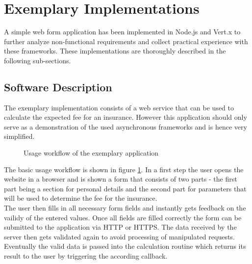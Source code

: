     


\newpage
\section{Exemplary Implementations}
\label{exemplary_implementations}

A simple web form application has been implemented in Node.js and Vert.x to
further analyze non-functional requirements and collect practical experience
with these frameworks. These implementations are thoroughly described in the following sub-sections.

\subsection{Software Description}
\label{software_description}
\FloatBarrier
The exemplary implementation consists of a web service that can be used to calculate
the expected fee for an insurance. However this application should only serve as a 
demonstration of the used asynchronous frameworks and is hence very simplified.

\begin{figure}[h]
	\centering
	\setlength\fboxsep{2pt}
	\caption{Usage workflow of the exemplary application}
	\label{fig:application_workflow}
\end{figure}


The basic usage workflow is shown in figure \ref{fig:application_workflow}. In a
first step the user opens the website in a browser and is shown a form that
consists of two parts - the first part being a section for personal details and
the second part for parameters that will be used to determine the fee for the
insurance.\\
The user then fills in all necessary form fields and instantly gets feedback on
the vailidy of the entered values. Once all fields are filled correctly the form
can be submitted to the application via HTTP or HTTPS. The data received by the server
then gets validated again to avoid processing of manipulated requests. Eventually
the valid data is passed into the calculation routine which returns its result
to the user by triggering the according callback.

